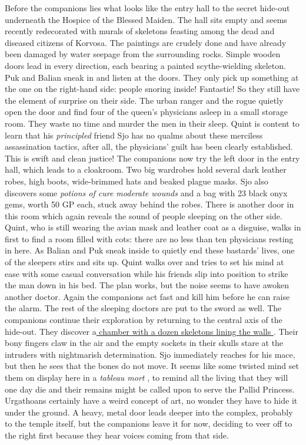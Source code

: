 Before the companions lies what looks like the entry hall to the secret hide-out underneath the Hospice of the Blessed Maiden. The hall sits empty and seems recently redecorated with murals of skeletons feasting among the dead and diseased citizens of Korvosa. The paintings are crudely done and have already been damaged by water seepage from the surrounding rocks. Simple wooden doors lead in every direction, each bearing a painted scythe-wielding skeleton.\\

Puk and Balian sneak in and listen at the doors. They only pick up something at the one on the right-hand side: people snoring inside! Fantastic! So they still have the element of surprise on their side. The urban ranger and the rogue quietly open the door and find four of the queen's physicians asleep in a small storage room. They waste no time and murder the men in their sleep. Quint is content to learn that his {\itshape principled} friend Sjo has no qualms about these merciless assassination tactics, after all, the physicians' guilt has been clearly established. This is swift and clean justice! The companions now try the left door in the entry hall, which leads to a cloakroom. Two big wardrobes hold several dark leather robes, high boots, wide-brimmed hats and beaked plague masks. Sjo also discovers some {\itshape potions of cure moderate wounds} and a bag with 23 black onyx gems, worth 50 GP each, stuck away behind the robes. There is another door in this room which again reveals the sound of people sleeping on the other side. Quint, who is still wearing the avian mask and leather coat as a disguise, walks in first to find a room filled with cots: there are no less than ten physicians resting in here. As Balian and Puk sneak inside to quietly end these bastards' lives, one of the sleepers stirs and sits up. Quint walks over and tries to set his mind at ease with some casual conversation while his friends slip into position to strike the man down in his bed. The plan works, but the noise seems to have awoken another doctor. Again the companions act fast and kill him before he can raise the alarm. The rest of the sleeping doctors are put to the sword as well. The companions continue their exploration by returning to the central axis of the hide-out. They discover a\hyperref[fig:Bacchanal-of-Urgathoa-beneath-the-Hospice-520054146]{ chamber with a dozen skeletons lining the walls } . Their bony fingers claw in the air and the empty sockets in their skulls stare at the intruders with nightmarish determination. Sjo immediately reaches for his mace, but then he sees that the bones do not move. It seems like some twisted mind set them on display here in a  {\itshape tableau mort} , to remind all the living that they will one day die and their remains might be called upon to serve the Pallid Princess. Urgathoans certainly have a weird concept of art, no wonder they have to hide it under the ground. A heavy, metal door leads deeper into the complex, probably to the temple itself, but the companions leave it for now, deciding to veer off to the right first because they hear voices coming from that side. \\

